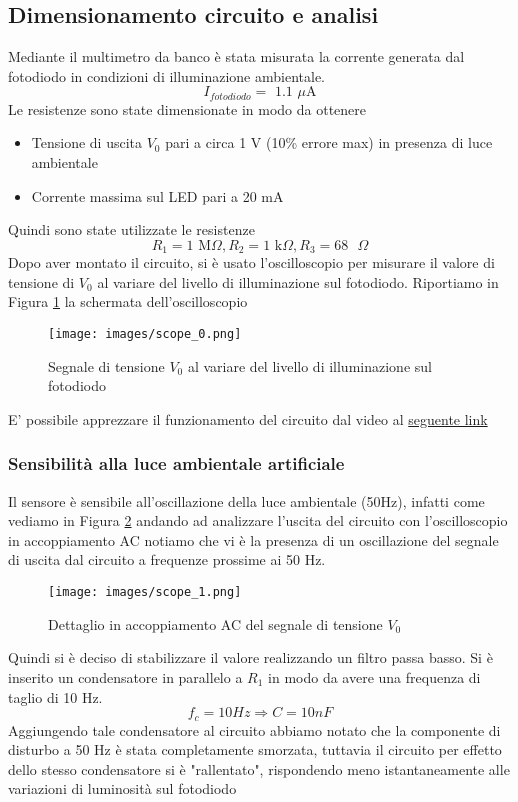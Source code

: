 \subsection{Dimensionamento circuito e analisi}
Mediante il multimetro da banco è stata misurata la corrente generata dal fotodiodo in condizioni di illuminazione ambientale. 
\begin{equation*}
    I_{fotodiodo}= \text{ 1.1 } \mu\text{A}
\end{equation*}
Le resistenze sono state dimensionate in modo da ottenere
\begin{itemize}
    \item Tensione di uscita $V_0$ pari a circa 1 V (10\% errore max) in presenza di luce ambientale
    \item Corrente massima sul LED pari a 20 mA
\end{itemize}
Quindi sono state utilizzate le resistenze
\begin{equation*}
    R_1 = 1\text{ M}\Omega, R_2 = 1\text{ k}\Omega, R_3 = 68\text{ }\Omega
\end{equation*}
Dopo aver montato il circuito, si è usato l'oscilloscopio per misurare il valore di tensione di $V_0$ al variare del livello di illuminazione sul fotodiodo. Riportiamo in Figura \ref{fig:scope_0} la schermata dell'oscilloscopio
\begin{figure}[H]
    \centering
    \texttt{[image: images/scope\_0.png]}
    \caption{Segnale di tensione $V_0$ al variare del livello di illuminazione sul fotodiodo}
    \label{fig:scope_0}
\end{figure}
E' possibile apprezzare il funzionamento del circuito dal video al \href{https://mediaspace.unipd.it/media/Esperimento+4/1_9r5biz93}{seguente link}
\subsubsection{Sensibilità alla luce ambientale artificiale}
Il sensore è sensibile all'oscillazione della luce ambientale (50Hz), infatti come vediamo in Figura \ref{fig:scope_1} andando ad analizzare l'uscita del circuito con l'oscilloscopio in accoppiamento AC notiamo che vi è la presenza di un oscillazione del segnale di uscita dal circuito a frequenze prossime ai 50 Hz.
\begin{figure}[H]
    \centering
    \texttt{[image: images/scope\_1.png]}
    \caption{Dettaglio in accoppiamento AC del segnale di tensione $V_0$}
    \label{fig:scope_1}
\end{figure}
Quindi si è deciso di stabilizzare il valore realizzando un filtro passa basso. Si è inserito un condensatore in parallelo a $R_1$ in modo da avere una frequenza di taglio di 10 Hz. 
\begin{equation}
    f_c=10 Hz \Longrightarrow C = 10nF
\end{equation}
Aggiungendo tale condensatore al circuito abbiamo notato che la componente di disturbo a 50 Hz è stata completamente smorzata, tuttavia il circuito per effetto dello stesso condensatore si è "rallentato", rispondendo meno istantaneamente alle variazioni di luminosità sul fotodiodo
